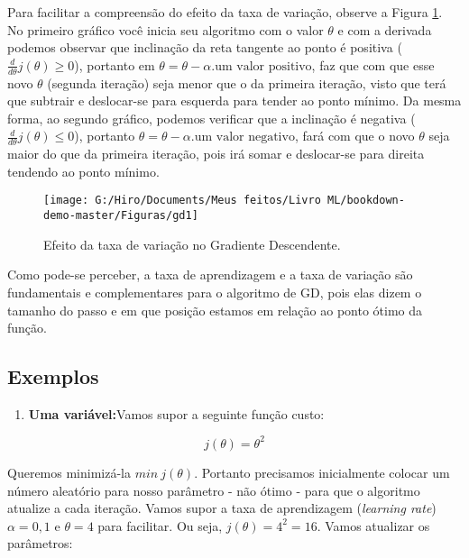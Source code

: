 \documentclass[
]{book}
\providecommand{\tightlist}{%
  \setlength{\itemsep}{0pt}\setlength{\parskip}{0pt}}
\begin{document}
Para facilitar a compreensão do efeito da taxa de variação, observe a Figura \ref{fig:gd1}. No primeiro gráfico você inicia seu algoritmo com o valor \(\theta\) e com a derivada podemos observar que inclinação da reta tangente ao ponto é positiva (\(\frac{d}{d\theta}j(\theta)\geq 0\)), portanto em \(\theta=\theta-\alpha.\mbox{um valor positivo}\), faz que com que esse novo \(\theta\) (segunda iteração) seja menor que o da primeira iteração, visto que terá que subtrair e deslocar-se para esquerda para tender ao ponto mínimo. Da mesma forma, ao segundo gráfico, podemos verificar que a inclinação é negativa (\(\frac{d}{d\theta}j(\theta)\leq 0\)), portanto \(\theta=\theta-\alpha.\mbox{um valor negativo}\), fará com que o novo \(\theta\) seja maior do que da primeira iteração, pois irá somar e deslocar-se para direita tendendo ao ponto mínimo.

\begin{figure}

{\centering \texttt{[image: G:/Hiro/Documents/Meus feitos/Livro ML/bookdown-demo-master/Figuras/gd1]} 

}

\caption{Efeito da taxa de variação no Gradiente Descendente.}\label{fig:gd1}
\end{figure}



Como pode-se perceber, a taxa de aprendizagem e a taxa de variação são fundamentais e complementares para o algoritmo de GD, pois elas dizem o tamanho do passo e em que posição estamos em relação ao ponto ótimo da função.

\hypertarget{exemplos-1}{%
\subsection{Exemplos}\label{exemplos-1}}

\begin{enumerate}
\def\labelenumi{\arabic{enumi}.}
\tightlist
\item
  \textbf{Uma variável:}Vamos supor a seguinte função custo:
\end{enumerate}

\[j(\theta)=\theta^2\]

Queremos minimizá-la \(min \ j(\theta)\). Portanto precisamos inicialmente colocar um número aleatório para nosso parâmetro - não ótimo - para que o algoritmo atualize a cada iteração. Vamos supor a taxa de aprendizagem (\emph{learning rate}) \(\alpha=0,1\) e \(\theta=4\) para facilitar. Ou seja, \(j(\theta)=4^2=16\). Vamos atualizar os parâmetros:
\end{document}
